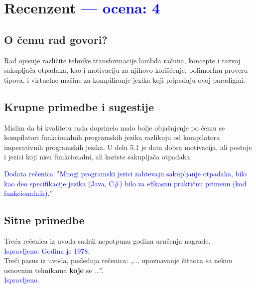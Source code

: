 \documentclass[a4paper]{report}
\newcommand{\odgovor}[1]{\textcolor{blue}{#1}}
\begin{document}
\chapter{Recenzent \odgovor{--- ocena: 4} }


\section{O čemu rad govori?}
Rad opisuje različite tehnike transformacije lambda računa, koncepte i razvoj sakupljača otpadaka, kao i motivaciju za njihovo korišćenje, polimorfnu proveru tipova, i virtuelne mašine za kompiliranje jezika koji pripadaju ovoj paradigmi.

\section{Krupne primedbe i sugestije}
Mislim da bi kvalitetu rada doprinelo malo bolje objašnjenje po čemu se kompilatori funkcionalnih programskih jezika razlikuju od kompilatora imperativnih programskih jezika. U delu 5.1 je data dobra motivacija, ali postoje i jezici koji nisu funkcionalni, ali koriste sakupljača otpadaka.

\odgovor{Dodata rečenica $"$Mnogi programski jezici zahtevaju sakupljanje otpadaka, bilo kao deo specifikacije jezika (Java, C\#) bilo za efikasnu praktičnu primenu (kod funkcionalnih).$"$ }

\section{Sitne primedbe}
Treća rečenica iz uvoda sadrži nepotpunu godinu uručenja nagrade.\\

\odgovor{Ispravljeno. Godina je 1978.}\\

Treći pasus iz uvoda, poslednja rečenica: „... upoznavanje čitaoca sa nekim osnovnim tehnikama \textbf{koje} se ...”.\\

\odgovor{Ispravljeno.}\\
\end{document}
